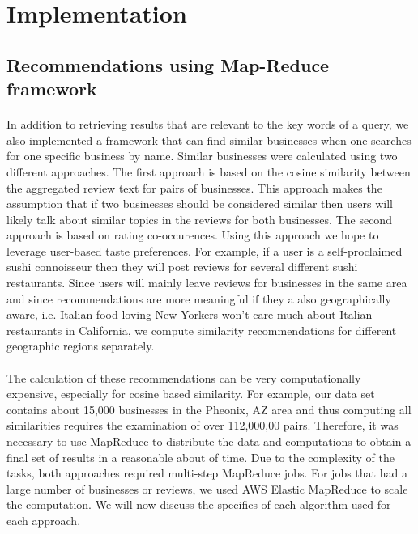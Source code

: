 \documentclass[paper=letter, fontsize=15pt]{article} %
\begin{document}
\section{Implementation}



\subsection{Recommendations using Map-Reduce framework}
\paragraph{}In addition to retrieving results that are relevant to the key words of a query, we also implemented a framework that can find similar businesses when one searches for one specific business by name. Similar businesses were calculated using two different approaches. The first approach is based on the cosine similarity between the aggregated review text for pairs of businesses. This approach makes the assumption that if two businesses should be considered similar then users will likely talk about similar topics in the reviews for both businesses. The second approach is based on rating co-occurences. Using this approach we hope to leverage user-based taste preferences. For example, if a user is a self-proclaimed sushi connoisseur then they will post reviews for several different sushi restaurants. Since users will mainly leave reviews for businesses in the same area and since recommendations are more meaningful if they a also geographically aware, i.e. Italian food loving New Yorkers won't care much about Italian restaurants in California, we compute similarity recommendations for different geographic regions separately.  

\paragraph{}The calculation of these recommendations can be very computationally expensive, especially for cosine based similarity. For example, our data set contains about 15,000 businesses in the Pheonix, AZ area and thus computing all similarities requires the examination of over 112,000,00 pairs. Therefore, it was necessary to use MapReduce to distribute the data and computations to obtain a final set of results in a reasonable about of time. Due to the complexity of the tasks, both approaches required multi-step MapReduce jobs. For jobs that had a large number of businesses or reviews, we used AWS Elastic MapReduce to scale the computation. We will now discuss the specifics of each algorithm used for each approach. 
\end{document}
